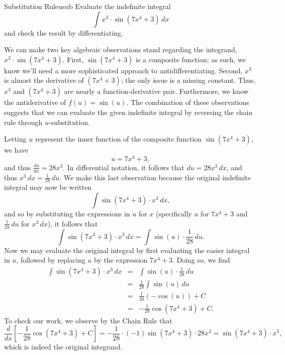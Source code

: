 \begin{example}{Substitution Rule}{usub}\label{usub}
Evaluate the indefinite integral
$$\int x^3 \cdot \sin (7x^4 + 3) \, dx$$
and check the result by differentiating.
\end{example}

\begin{solution} 
We can make two key algebraic observations stand regarding the integrand, $x^3 \cdot \sin (7x^4 + 3)$.  First, $\sin (7x^4 + 3)$ is a composite function; as such, we know we'll need a more sophisticated approach to antidifferentiating.  Second, $x^3$ is almost the derivative of $(7x^4 + 3)$; the only issue is a missing constant.  Thus, $x^3$ and $(7x^4 + 3)$ are nearly a function-derivative pair.  Furthermore, we know the antiderivative of $f(u) = \sin(u)$.  The combination of these observations suggests that we can evaluate the given indefinite integral by reversing the chain rule through $u$-substitution.

Letting $u$ represent the inner function of the composite function $\sin (7x^4 + 3)$, we have
$$u = 7x^4 + 3,$$
and thus $\frac{du}{dx} = 28x^3.$  In differential notation, it follows that $du = 28x^3 \, dx$, and thus $x^3 \, dx = \frac{1}{28} \, du$.  We make this last observation because the original indefinite integral may now be written 
$$\int \sin (7x^4 + 3) \cdot x^3 \, dx,$$
and so by substituting the expressions in $u$ for $x$ (specifically $u$ for $7x^4 + 3$ and $\frac{1}{28} \, du$ for $x^3 \, dx$), it follows that
$$\int \sin (7x^4 + 3) \cdot x^3 \, dx = \int \sin(u) \cdot \frac{1}{28} \, du.$$
Now we may evaluate the original integral by first evaluating the easier integral in $u$, followed by replacing $u$ by the expression $7x^4 + 3$.  Doing so, we find
\begin{eqnarray*}
\int \sin (7x^4 + 3) \cdot x^3 \, dx & = & \int \sin(u) \cdot \frac{1}{28} \, du \\
						& = & \frac{1}{28} \int \sin(u) \, du \\
						& = & \frac{1}{28} (-\cos(u)) + C \\
						& = & -\frac{1}{28} \cos(7x^4 + 3) + C.
\end{eqnarray*}
To check our work, we observe by the Chain Rule that
$$\frac{d}{dx} \left[ -\frac{1}{28}\cos(7x^4 + 3) + C \right] = -\frac{1}{28} \cdot (-1)\sin(7x^4 + 3) \cdot 28x^3 = \sin(7x^4 + 3) \cdot x^3,$$
which is indeed the original integrand.
\end{solution}

